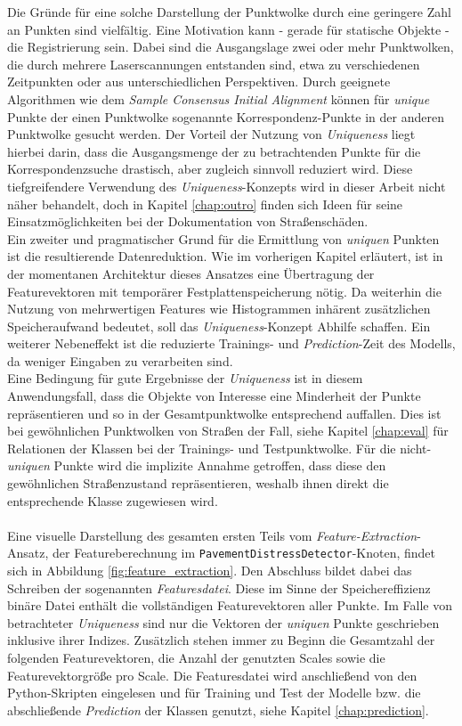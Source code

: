 Die Gründe für eine solche Darstellung der Punktwolke durch eine geringere Zahl an Punkten sind vielfältig. Eine Motivation kann - gerade für statische Objekte - die Registrierung sein. Dabei sind die Ausgangslage zwei oder mehr Punktwolken, die durch mehrere Laserscannungen entstanden sind, etwa zu verschiedenen Zeitpunkten oder aus unterschiedlichen Perspektiven. Durch geeignete Algorithmen wie dem \textit{Sample Consensus Initial Alignment} \citep{Rusu.etal-2009} können für \textit{unique} Punkte der einen Punktwolke sogenannte Korrespondenz-Punkte in der anderen Punktwolke gesucht werden. Der Vorteil der Nutzung von \textit{Uniqueness} liegt hierbei darin, dass die Ausgangsmenge der zu betrachtenden Punkte für die Korrespondenzsuche drastisch, aber zugleich sinnvoll reduziert wird. Diese tiefgreifendere Verwendung des \textit{Uniqueness}-Konzepts wird in dieser Arbeit nicht näher behandelt, doch in Kapitel \ref{chap:outro} finden sich Ideen für seine Einsatzmöglichkeiten bei der Dokumentation von Straßenschäden. \\
Ein zweiter und pragmatischer Grund für die Ermittlung von \textit{uniquen} Punkten ist die resultierende Datenreduktion. Wie im vorherigen Kapitel erläutert, ist in der momentanen Architektur dieses Ansatzes eine Übertragung der Featurevektoren mit temporärer Festplattenspeicherung nötig. Da weiterhin die Nutzung von mehrwertigen Features wie Histogrammen inhärent zusätzlichen Speicheraufwand bedeutet, soll das \textit{Uniqueness}-Konzept Abhilfe schaffen. Ein weiterer Nebeneffekt ist die reduzierte Trainings- und \textit{Prediction}-Zeit des Modells, da weniger Eingaben zu verarbeiten sind. \\
Eine Bedingung für gute Ergebnisse der \textit{Uniqueness} ist in diesem Anwendungsfall, dass die Objekte von Interesse eine Minderheit der Punkte repräsentieren und so in der Gesamtpunktwolke entsprechend auffallen. Dies ist bei gewöhnlichen Punktwolken von Straßen der Fall, siehe Kapitel \ref{chap:eval} für Relationen der Klassen bei der Trainings- und Testpunktwolke. Für die nicht-\textit{uniquen} Punkte wird die implizite Annahme getroffen, dass diese den gewöhnlichen Straßenzustand repräsentieren, weshalb ihnen direkt die entsprechende Klasse zugewiesen wird. \\\\
Eine visuelle Darstellung des gesamten ersten Teils vom \textit{Feature-Extraction}-Ansatz, der Featureberechnung im \texttt{PavementDistressDetector}-Knoten, findet sich in Abbildung \ref{fig:feature_extraction}. 
Den Abschluss bildet dabei das Schreiben der sogenannten \textit{Featuresdatei}. Diese im Sinne der Speichereffizienz binäre Datei enthält die vollständigen Featurevektoren aller Punkte. Im Falle von betrachteter \textit{Uniqueness} sind nur die Vektoren der \textit{uniquen} Punkte geschrieben inklusive ihrer Indizes. Zusätzlich stehen immer zu Beginn die Gesamtzahl der folgenden Featurevektoren, die Anzahl der genutzten Scales sowie die Featurevektorgröße pro Scale. Die Featuresdatei wird anschließend von den Python-Skripten eingelesen und für Training und Test der Modelle bzw. die abschließende \textit{Prediction} der Klassen genutzt, siehe Kapitel \ref{chap:prediction}.

